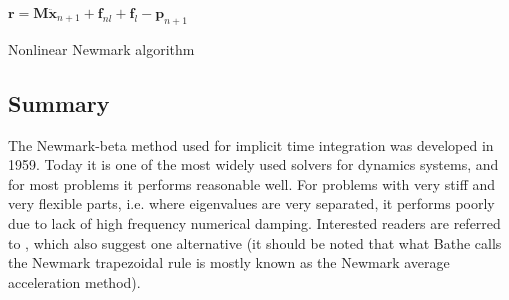 \begin{algorithm}
{{    $\bm r = \bm M \ddot{\bm x}_{n+1} + \bm f_{nl} + \bm f_{l} -  \bm p_{n+1}$
  }
}
  \caption{Nonlinear Newmark algorithm}
  \label{algo:nonlin_newmark}
\end{algorithm}

\subsection{Summary}

The Newmark-beta method used for implicit time integration was developed in
1959. Today it is one of the most widely used solvers for dynamics systems, and
for most problems it performs reasonable well. For problems with very stiff and
very flexible parts, i.e. where eigenvalues are very separated, it performs
poorly due to lack of high frequency numerical damping. Interested readers are
referred to \cite{bathe2012a}, which also suggest one alternative (it should be
noted that what Bathe calls the Newmark trapezoidal rule is mostly known as the
Newmark average acceleration method).


